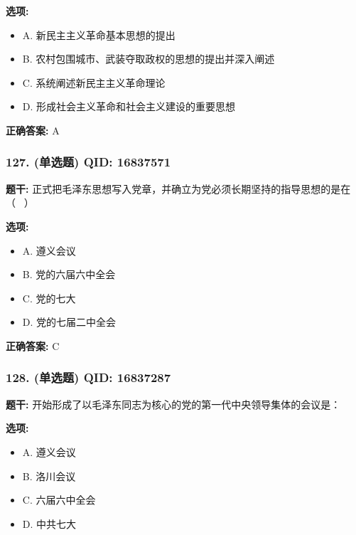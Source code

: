 \documentclass[12pt,UTF8]{ctexart}
\begin{document}
\textbf{选项:}
\begin{itemize}[leftmargin=*]

  \item A. 新民主主义革命基本思想的提出

  \item B. 农村包围城市、武装夺取政权的思想的提出并深入阐述

  \item C. 系统阐述新民主主义革命理论

  \item D. 形成社会主义革命和社会主义建设的重要思想

\end{itemize}

\textbf{正确答案:}
A

\vspace{0.3em}\hrulefill\vspace{0.7em}

\subsubsection*{127. (单选题) \small QID: 16837571}

\textbf{题干:}
正式把毛泽东思想写入党章，并确立为党必须长期坚持的指导思想的是在（  ）

\textbf{选项:}
\begin{itemize}[leftmargin=*]

  \item A. 遵义会议

  \item B. 党的六届六中全会

  \item C. 党的七大

  \item D. 党的七届二中全会

\end{itemize}

\textbf{正确答案:}
C

\vspace{0.3em}\hrulefill\vspace{0.7em}

\subsubsection*{128. (单选题) \small QID: 16837287}

\textbf{题干:}
开始形成了以毛泽东同志为核心的党的第一代中央领导集体的会议是：

\textbf{选项:}
\begin{itemize}[leftmargin=*]

  \item A. 遵义会议

  \item B. 洛川会议

  \item C. 六届六中全会

  \item D. 中共七大

\end{itemize}
\end{document}
